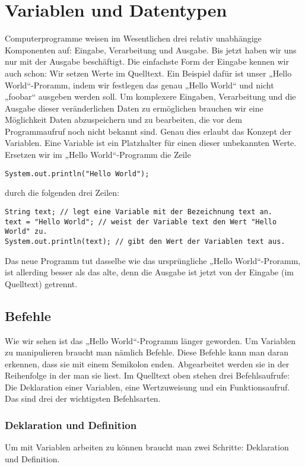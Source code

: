 \chapter{Variablen und Datentypen}
Computerprogramme weisen im Wesentlichen drei relativ unabhängige Komponenten auf: Eingabe, Verarbeitung und Ausgabe. Bis jetzt haben wir uns nur mit der Ausgabe beschäftigt.
Die einfachste Form der Eingabe kennen wir auch schon: Wir setzen Werte im Quelltext. Ein Beispiel dafür ist unser „Hello World“-Proramm, indem wir festlegen das genau „Hello World“ und nicht „foobar“ ausgeben werden soll.
Um komplexere Eingaben, Verarbeitung und die Ausgabe dieser veränderlichen Daten zu ermöglichen brauchen wir eine Möglichkeit Daten abzuspeichern und zu bearbeiten, die vor dem Programmaufruf noch nicht bekannt sind.
Genau dies erlaubt das Konzept der Variablen. Eine Variable ist ein Platzhalter für einen dieser unbekannten Werte. \\

Ersetzen wir im „Hello World“-Programm die Zeile
\begin{lstlisting}
System.out.println("Hello World");
\end{lstlisting}
durch die folgenden drei Zeilen:
\begin{lstlisting}
String text; // legt eine Variable mit der Bezeichnung text an.
text = "Hello World"; // weist der Variable text den Wert "Hello World" zu.
System.out.println(text); // gibt den Wert der Variablen text aus.
\end{lstlisting}

Das neue Programm tut dasselbe wie das ursprüngliche „Hello World“-Proramm, ist allerding besser als das alte, denn die Ausgabe ist jetzt von der Eingabe (im Quelltext) getrennt.

\section {Befehle}
Wie wir sehen ist das „Hello World“-Programm länger geworden. Um Variablen zu manipulieren braucht man nämlich Befehle. Diese Befehle kann man daran erkennen, dass sie mit einem Semikolon enden. Abgearbeitet werden sie in der Reihenfolge in der man sie liest. Im Quelltext oben stehen drei Befehlsaufrufe:
Die Deklaration einer Variablen, eine Wertzuweisung und ein Funktionsaufruf. Das sind drei der wichtigsten Befehlsarten.

\subsection {Deklaration und Definition}
Um mit Variablen arbeiten zu können braucht man zwei Schritte: Deklaration und Definition.

